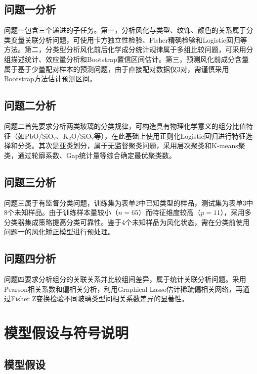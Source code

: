 \documentclass[fontset=windows, 12pt, a4paper]{ctexart}
\begin{document}
\subsection{问题一分析}

问题一包含三个递进的子任务。第一，分析风化与类型、纹饰、颜色的关系属于分类变量关联分析问题，可使用卡方独立性检验、Fisher精确检验和Logistic回归等方法。第二，分类型分析风化前后化学成分统计规律属于多组比较问题，可采用分组描述统计、效应量分析和Bootstrap置信区间估计。第三，预测风化前成分含量属于基于少量配对样本的预测问题，由于直接配对数据仅3对，需谨慎采用Bootstrap方法估计预测区间。

\subsection{问题二分析}

问题二首先要求分析两类玻璃的分类规律，可构造具有物理化学意义的组分比值特征（如PbO/SiO$_2$、K$_2$O/SiO$_2$等），在此基础上使用正则化Logistic回归进行特征选择和分类。其次是亚类划分，属于无监督聚类问题，采用层次聚类和K-means聚类，通过轮廓系数、Gap统计量等综合确定最优聚类数。

\subsection{问题三分析}

问题三属于有监督分类问题，训练集为表单2中已知类型的样品，测试集为表单3中8个未知样品。由于训练样本量较小（$n=65$）而特征维度较高（$p=11$），采用多分类器集成策略提高分类可靠性。鉴于4个未知样品为风化状态，需在分类前使用问题一的风化矫正模型进行预处理。

\subsection{问题四分析}

问题四要求分析组分的关联关系并比较组间差异，属于统计关联分析问题。采用Pearson相关系数和偏相关分析，利用Graphical Lasso估计稀疏偏相关网络，再通过Fisher Z变换检验不同玻璃类型间相关系数差异的显著性。

\newpage

\section{模型假设与符号说明}

\subsection{模型假设}
\end{document}
